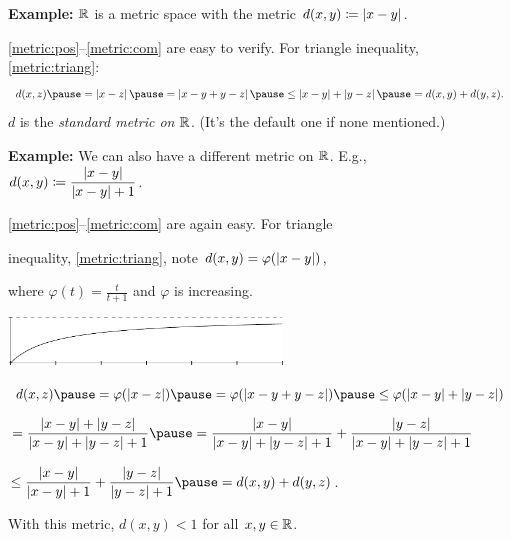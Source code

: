 \documentclass[10pt,aspectratio=169]{beamer}
\begin{document}
\begin{frame}

\textbf{Example:}
${\mathbb{R}}$ is a metric space with the metric
\quad $d(x,y) \coloneqq \left\lvert {x-y} \right\rvert$.

\pause
\eqref{metric:pos}--\eqref{metric:com} are easy to verify.
\pause
\quad
For triangle inequality, \eqref{metric:triang}:
\begin{equation*}
d(x,z)
\pause
= \abs{x-z}
\pause
= 
\abs{x-y+y-z}
\pause
\leq
\abs{x-y}+\abs{y-z}
\pause
=
d(x,y)+ d(y,z) .
\end{equation*}
\pause
$d$ is the \emph{standard metric on ${\mathbb{R}}$}.
\pause
\quad (It's the default one if none mentioned.)

\pause
\medskip

\textbf{Example:}
We can also have a different metric on ${\mathbb{R}}$.
\pause
E.g.,
~
$
d(x,y)
\coloneqq
\dfrac{\left\lvert {x-y} \right\rvert}{\left\lvert {x-y} \right\rvert+1}$.

\pause
\eqref{metric:pos}--\eqref{metric:com} are again easy.
\pause
\quad
For triangle

inequality, \eqref{metric:triang}, note
$d(x,y) = \varphi(\left\lvert {x-y} \right\rvert)$,

where $\varphi(t) = \frac{t}{t+1}$ and
$\varphi$ is increasing.

\vspace*{-0.5in}
\hspace*{2.7in}
\includegraphics[height=0.5in]{../figures/tovertp1graph}

\vspace*{-0.05in}

\pause
\medskip

$
d(x,z)
\pause
=
\varphi(\abs{x-z})
\pause
= 
\varphi(\abs{x-y+y-z})
\pause
\leq
\varphi(\abs{x-y}+\abs{y-z})
$

\pause
\medskip

\qquad
$
=
\dfrac{\abs{x-y}+\abs{y-z}}{\abs{x-y}+\abs{y-z}+1}
\pause
=
\dfrac{\abs{x-y}}{\abs{x-y}+\abs{y-z}+1} +
\dfrac{\abs{y-z}}{\abs{x-y}+\abs{y-z}+1}
$

\pause
\medskip

\qquad
$
\leq
\dfrac{\abs{x-y}}{\abs{x-y}+1} +
\dfrac{\abs{y-z}}{\abs{y-z}+1}
\pause
=
d(x,y)+ d(y,z)$.

\pause
\medskip

With this metric, $d(x,y) < 1$ for all $x,y \in {\mathbb{R}}$.

\end{frame}
\end{document}
